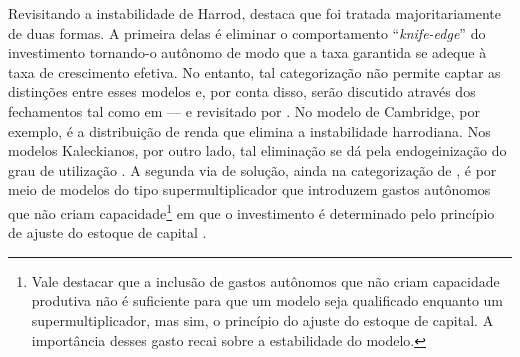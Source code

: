 Revisitando a instabilidade de Harrod, \textcite{allain_macroeconomic_2014} destaca que foi tratada majoritariamente de duas formas. A primeira delas é eliminar o comportamento  ``\textit{knife-edge}'' do investimento tornando-o autônomo de modo que a taxa garantida se adeque à taxa de crescimento efetiva. No entanto, tal categorização não permite captar as distinções entre esses modelos e, por conta disso, serão discutido através dos fechamentos tal como em \textcite{serrano_long_1995} --- e revisitado por \textcite{serrano_har_2018}. No modelo de Cambridge, por exemplo, é a distribuição de renda que elimina a instabilidade harrodiana. Nos modelos Kaleckianos, por outro lado, tal eliminação  se dá pela endogeinização do grau de utilização
.
A segunda via de solução, ainda na categorização de \textcite{allain_macroeconomic_2014}, é por meio de modelos do tipo supermultiplicador que introduzem gastos autônomos que não criam capacidade\footnote{Vale destacar que a inclusão de gastos autônomos que não criam capacidade produtiva não é suficiente para que um modelo seja qualificado enquanto um supermultiplicador, mas sim, o princípio do ajuste do estoque de capital. A importância desses gasto recai sobre a estabilidade do modelo.} em que o investimento é determinado pelo princípio de ajuste do estoque de capital \cites{serrano_long_1995}{serrano_sraffian_1995}{bortis_institutions_1996}
.






\begin{comment}
DESCARTADOS

\section{Convergência ao grau de utilização normal: dois paradigmas e os dois paradoxos}\label{debate}


\end{comment}